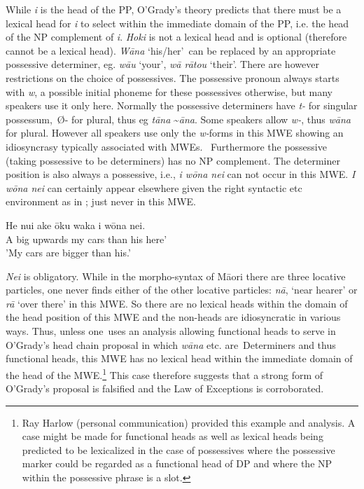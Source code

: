 \documentclass[output=paper]{langsci/langscibook}
\begin{document}
While \textit{i} is the head of the PP, O’Grady’s theory predicts that there must be a lexical head for \textit{i} to select within the immediate domain of the PP, i.e. the head of the NP complement of \textit{i}. \textit{Hoki} is not a lexical head and is optional (therefore cannot be a lexical head).  \textit{W\=ana} ‘his/her’~can be replaced by an appropriate possessive determiner, eg. \textit{w\=au} ‘your’, \textit{w\=a r\=atou} ‘their’. There are however restrictions on the choice of possessives. The possessive pronoun always starts with \textit{w}, a possible initial phoneme for these possessives otherwise, but many speakers use it only here. Normally the possessive determiners have \textit{t-} for singular possessum,~Ø- for plural, thus eg \textit{t\=ana} {\textasciitilde}\textit{\=ana}. Some speakers allow \textit{w-}, thus \textit{w\=ana} for plural. However all speakers use only the \textit{w-}forms in this MWE showing an idiosyncrasy typically associated with MWEs.~ Furthermore the possessive (taking possessive to be determiners) has no NP complement. The determiner position is also always a possessive, i.e., \textit{i w\=ona nei} 
can not occur in this MWE. \textit{I w\=ona nei} can certainly appear elsewhere given the right syntactic etc environment as in ; just never in this MWE.

\ea\label{ex:ex30}
\gll He nui ake     \=oku waka i    w\=ona nei.\\
                    A  big upwards my    cars than his    here'\\
\glt 'My cars are bigger than his.'
\z


\textit{Nei} is obligatory. While in the morpho-syntax of M\=aori  there are three locative particles, one never finds either of the other locative particles: \textit{n\=a}, ‘near hearer’ or \textit{r\=a} ‘over there’ in this MWE. So there are no lexical heads within the domain of the head position of this MWE and the non-heads are idiosyncratic in various ways. Thus, unless one~uses an analysis allowing functional heads to serve in O’Grady’s head chain proposal in which \textit{w\=ana} etc. are~Determiners and thus functional heads, this MWE has no lexical head within the immediate domain of the head of the MWE.\footnote{   Ray Harlow (personal communication) provided this example and analysis. A case might be made for functional heads as well as lexical heads being predicted to be lexicalized in the case of possessives where the possessive marker could be regarded as a functional head of DP and where the NP within the possessive phrase is a slot.} This case therefore suggests that a strong form of O’Grady’s proposal is falsified and the Law of Exceptions is corroborated. 
\end{document}
